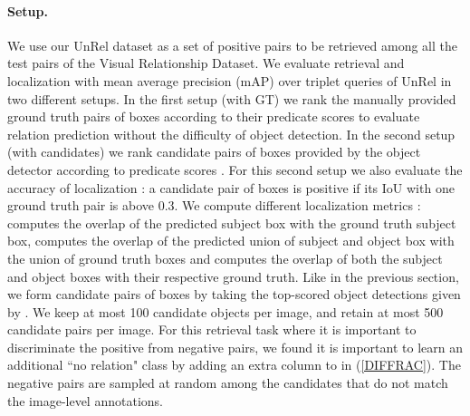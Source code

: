 \documentclass[10pt,twocolumn,letterpaper]{article}
\begin{document}
\paragraph{Setup.} 
We use our UnRel dataset as a set of positive pairs to be retrieved among all the test pairs of the Visual Relationship Dataset. We evaluate retrieval and localization with mean average precision (mAP) over triplet queries  of UnRel in two different setups. In the first setup (with GT) we rank the manually provided ground truth pairs of boxes  according to their predicate scores  to evaluate relation prediction without the difficulty of object detection. In the second setup (with candidates) we rank candidate pairs of boxes  provided by the object detector according to predicate scores . For this second setup we also evaluate the accuracy of localization : a candidate pair of boxes is positive if its IoU with one ground truth pair is above 0.3. We compute different localization metrics :  computes the overlap of the predicted subject box with the ground truth subject box,  computes the overlap of the predicted union of subject and object box with the union of ground truth boxes and  computes the overlap of both the subject and object boxes with their respective ground truth. Like in the previous section, we form candidate pairs of boxes by taking the top-scored object detections given by \cite{girshick15fastrcnn}. We keep at most 100 candidate objects per image, and retain at most 500 candidate pairs per image. For this retrieval task where it is important to discriminate the positive from negative pairs, we found it is important to learn an additional ``no relation" class by adding an extra column to  in (\ref{DIFFRAC}). The negative pairs are sampled at random among the candidates that do not match the image-level annotations.
\end{document}
